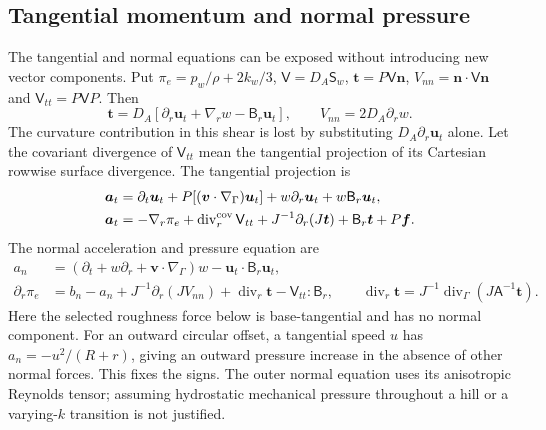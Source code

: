 \documentclass[11pt,a4paper]{article}
\numberwithin{equation}{section}
\begin{document}
\subsection{Tangential momentum and normal pressure}
The tangential and normal equations can be exposed without introducing
new vector components. Put $\pi_e=p_w/\rho+2k_w/3$,
$\mathsf V=D_A\mathsf S_w$, $\bm t=P\mathsf V\bm n$,
$V_{nn}=\bm n\cdot\mathsf V\bm n$ and $\mathsf V_{tt}=P\mathsf VP$.
Then
\begin{equation}
 \bm t=D_A[\partial_r\bm u_t+\nabla_rw-\mathsf B_r\bm u_t],
 \qquad V_{nn}=2D_A\partial_rw.
 \label{eq:wj-wall-curvature-shear}
\end{equation}
The curvature contribution in this shear is lost by substituting
$D_A\partial_r\bm u_t$ alone. Let the covariant divergence of
$\mathsf V_{tt}$ mean the tangential projection of its Cartesian
rowwise surface divergence. The tangential projection is
\begin{equation}
 \begin{aligned}
 \bm a_t&=\partial_t\bm u_t+P[(\bm v\cdot\nabla_\Gamma)\bm u_t]
       +w\partial_r\bm u_t+w\mathsf B_r\bm u_t,\\
 \bm a_t&=-\nabla_r\pi_e+\operatorname{div}_r^{\rm cov}\mathsf V_{tt}
       +J^{-1}\partial_r(J\bm t)+\mathsf B_r\bm t+P\bm f.
 \end{aligned}
 \label{eq:wj-wall-tangential-momentum}
\end{equation}
The normal acceleration and pressure equation are
\begin{equation}
 \begin{aligned}
 a_n&=(\partial_t+w\partial_r+\bm v\cdot\nabla_\Gamma)w
                     -\bm u_t\cdot\mathsf B_r\bm u_t,\\
 \partial_r\pi_e&=b_n-a_n+J^{-1}\partial_r(JV_{nn})
                +\operatorname{div}_r\bm t-\mathsf V_{tt}:\mathsf B_r,
 \qquad
 \operatorname{div}_r\bm t=J^{-1}\operatorname{div}_\Gamma
                                  (J\mathsf A^{-1}\bm t).
 \end{aligned}
 \label{eq:wj-wall-normal-momentum}
\end{equation}
Here the selected roughness force below is base-tangential and has no
normal component. For an outward circular offset, a tangential speed $u$
has $a_n=-u^2/(R+r)$, giving an outward pressure increase in the absence
of other normal forces. This fixes the signs. The outer normal equation
uses its anisotropic Reynolds tensor; assuming hydrostatic mechanical
pressure throughout a hill or a varying-$k$ transition is not justified.
\end{document}
